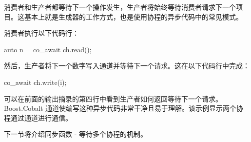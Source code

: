 消费者和生产者都等待下一个操作发生，生产者将始终等待消费者请求下一个项目。这基本上就是生成器的工作方式，也是使用协程的异步代码中的常见模式。

消费者执行以下代码行：

\begin{cpp}
auto n = co_await ch.read();
\end{cpp}

然后，生产者将下一个数字写入通道并等待下一个请求。这在以下代码行中完成：

\begin{cpp}
co_await ch.write(i);
\end{cpp}

可以在前面的输出摘录的第四行中看到生产者如何返回等待下一个请求。Boost.Cobalt 通道使编写这种异步代码非常干净且易于理解。该示例显示两个协程通过通道进行通信。

下一节将介绍同步函数 - 等待多个协程的机制。








